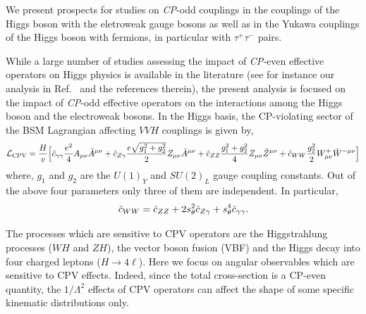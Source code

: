 
 We present prospects for studies on {\it CP}-odd couplings in the
 couplings of the Higgs boson with the eletroweak gauge bosons
 as well as in the Yukawa couplings of the Higgs boson with
 fermions, in particular with $\tau^+ \tau^-$ pairs.
 

While a large number of studies assessing the impact of {\it CP}-even  
effective operators on Higgs physics is available in the literature 
(see for instance our analysis in Ref.~\cite{Boselli:2017pef} and the references therein), 
the present analysis is focused on the impact of {\it CP}-odd effective operators on the 
interactions among the Higgs boson and the electroweak bosons. 
In the Higgs basis, the CP-violating sector of the BSM Lagrangian affecting $VVH$ couplings 
is given by, 
% 
\begin{eqnarray}
\mathcal{L}_{\rm CPV} =  \frac{H}{v} \Big[
\tilde c_{\gamma\gamma} \frac{e^2}{4} A_{\mu\nu}\tilde{A}^{\mu\nu}  
+ \tilde c_{Z\gamma} \frac{e\sqrt{g_1^2 + g_2^2}}{2} Z_{\mu\nu}\tilde{A}^{\mu\nu} 
+ \tilde c_{ZZ} \frac{g_1^2 + g_2^2}{4} Z_{\mu\nu}\tilde{Z}^{\mu\nu} + \tilde{c}_{WW} \frac{g_2^2}{2}  W^+_{\mu\nu} \tilde W^{-\mu\nu}\Big]
\label{eqn:Hvv}
\end{eqnarray}  
where, $g_1$ and $g_2$ are the $U(1)_Y$  and  $SU(2)_L$ gauge coupling constants. Out of the above four 
parameters only three of them  are independent. In particular,
\begin{equation}
 \tilde c_{WW} = \tilde c_{ZZ} + 2s_\theta^2 \tilde c_{Z\gamma} + s_\theta^4 \tilde c_{\gamma\gamma}.
\end{equation}

The processes which are sensitive to CPV operators are the Higgstrahlung processes ($WH$ and $ZH$), the vector boson fusion (VBF) and the Higgs decay into four charged leptons ($H\to4\ell$). Here we focus on angular observables which are sensitive to CPV effects. Indeed, since the total cross-section is a CP-even quantity,  the $1/\Lambda^2$ effects of CPV operators can affect the shape of some specific kinematic distributions only. 



